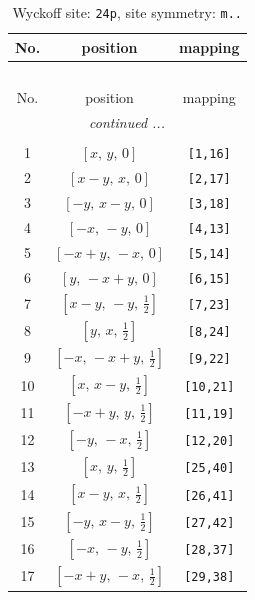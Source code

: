 \documentclass[fleqn,8pt]{jsarticle}
\begin{document}
\begin{longtable}{ccc}
\caption{Wyckoff site: {\tt 24p}, site symmetry: {\tt m..}}
 \\
 \hline \hline
No. & position & mapping \\ \hline \endfirsthead

\multicolumn{2}{l}{\tablename\ \thetable{}} \\
 \hline \hline
No. & position & mapping \\ \hline \endhead

 \hline \hline
\multicolumn{2}{r}{\footnotesize\it continued ...} \\ \endfoot

 \hline \hline
\multicolumn{2}{r}{} \\ \endlastfoot

1 & $\left[ x,\, y,\, 0 \right]$ & {\tt [1,16]} \\ \hline
2 & $\left[ x - y,\, x,\, 0 \right]$ & {\tt [2,17]} \\ \hline
3 & $\left[ - y,\, x - y,\, 0 \right]$ & {\tt [3,18]} \\ \hline
4 & $\left[ - x,\, - y,\, 0 \right]$ & {\tt [4,13]} \\ \hline
5 & $\left[ - x + y,\, - x,\, 0 \right]$ & {\tt [5,14]} \\ \hline
6 & $\left[ y,\, - x + y,\, 0 \right]$ & {\tt [6,15]} \\ \hline
7 & $\left[ x - y,\, - y,\, \frac{1}{2} \right]$ & {\tt [7,23]} \\ \hline
8 & $\left[ y,\, x,\, \frac{1}{2} \right]$ & {\tt [8,24]} \\ \hline
9 & $\left[ - x,\, - x + y,\, \frac{1}{2} \right]$ & {\tt [9,22]} \\ \hline
10 & $\left[ x,\, x - y,\, \frac{1}{2} \right]$ & {\tt [10,21]} \\ \hline
11 & $\left[ - x + y,\, y,\, \frac{1}{2} \right]$ & {\tt [11,19]} \\ \hline
12 & $\left[ - y,\, - x,\, \frac{1}{2} \right]$ & {\tt [12,20]} \\ \hline
13 & $\left[ x,\, y,\, \frac{1}{2} \right]$ & {\tt [25,40]} \\ \hline
14 & $\left[ x - y,\, x,\, \frac{1}{2} \right]$ & {\tt [26,41]} \\ \hline
15 & $\left[ - y,\, x - y,\, \frac{1}{2} \right]$ & {\tt [27,42]} \\ \hline
16 & $\left[ - x,\, - y,\, \frac{1}{2} \right]$ & {\tt [28,37]} \\ \hline
17 & $\left[ - x + y,\, - x,\, \frac{1}{2} \right]$ & {\tt [29,38]} \\ \hline

\end{longtable}
\end{document}
